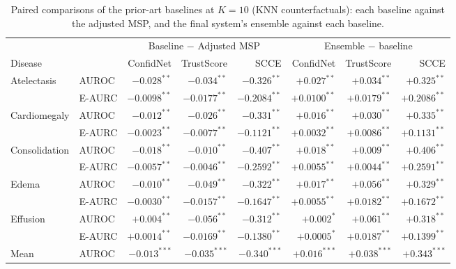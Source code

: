 \begin{table}[htbp]
\centering
\small
\caption{Paired comparisons of the prior-art baselines at $K=10$ (KNN counterfactuals): each baseline against the adjusted MSP, and the final system's ensemble against each baseline.}
\label{tab:baselines_tests_knn}
\begin{threeparttable}
\begin{tabular}{ll|rrr|rrr}
\toprule
\multicolumn{2}{c|}{} & \multicolumn{3}{c|}{Baseline $-$ Adjusted MSP} & \multicolumn{3}{c}{Ensemble $-$ baseline} \\
\cmidrule(lr){3-5} \cmidrule(l){6-8}
Disease &  & ConfidNet & TrustScore & SCCE & ConfidNet & TrustScore & SCCE \\
\midrule
\multirow{2}{*}{Atelectasis} & AUROC & $-0.028^{**}$ & $-0.034^{**}$ & $-0.326^{**}$ & $+0.027^{**}$ & $+0.034^{**}$ & $+0.325^{**}$ \\
 & E-AURC & $-0.0098^{**}$ & $-0.0177^{**}$ & $-0.2084^{**}$ & $+0.0100^{**}$ & $+0.0179^{**}$ & $+0.2086^{**}$ \\
\midrule
\multirow{2}{*}{Cardiomegaly} & AUROC & $-0.012^{**}$ & $-0.026^{**}$ & $-0.331^{**}$ & $+0.016^{**}$ & $+0.030^{**}$ & $+0.335^{**}$ \\
 & E-AURC & $-0.0023^{**}$ & $-0.0077^{**}$ & $-0.1121^{**}$ & $+0.0032^{**}$ & $+0.0086^{**}$ & $+0.1131^{**}$ \\
\midrule
\multirow{2}{*}{Consolidation} & AUROC & $-0.018^{**}$ & $-0.010^{**}$ & $-0.407^{**}$ & $+0.018^{**}$ & $+0.009^{**}$ & $+0.406^{**}$ \\
 & E-AURC & $-0.0057^{**}$ & $-0.0046^{**}$ & $-0.2592^{**}$ & $+0.0055^{**}$ & $+0.0044^{**}$ & $+0.2591^{**}$ \\
\midrule
\multirow{2}{*}{Edema} & AUROC & $-0.010^{**}$ & $-0.049^{**}$ & $-0.322^{**}$ & $+0.017^{**}$ & $+0.056^{**}$ & $+0.329^{**}$ \\
 & E-AURC & $-0.0030^{**}$ & $-0.0157^{**}$ & $-0.1647^{**}$ & $+0.0055^{**}$ & $+0.0182^{**}$ & $+0.1672^{**}$ \\
\midrule
\multirow{2}{*}{Effusion} & AUROC & $+0.004^{**}$ & $-0.056^{**}$ & $-0.312^{**}$ & $+0.002^{*}$ & $+0.061^{**}$ & $+0.318^{**}$ \\
 & E-AURC & $+0.0014^{**}$ & $-0.0169^{**}$ & $-0.1380^{**}$ & $+0.0005^{*}$ & $+0.0187^{**}$ & $+0.1399^{**}$ \\
\midrule
\multirow{2}{*}{Mean} & AUROC & $-0.013^{***}$ & $-0.035^{***}$ & $-0.340^{***}$ & $+0.016^{***}$ & $+0.038^{***}$ & $+0.343^{***}$ \\

\end{tabular}
\end{threeparttable}
\end{table}
